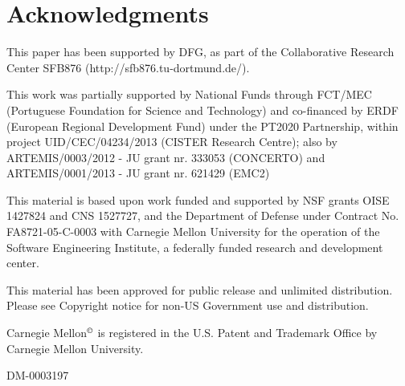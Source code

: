 \begingroup
\let\clearpage\relax
\let\cleardoublepage\relax
\let\cleardoublepage\relax



\vfill

\chapter*{Acknowledgments}

This paper has been supported by DFG, as part of the Collaborative
Research Center SFB876 (http://sfb876.tu-dortmund.de/).

This work was partially supported by National Funds through FCT/MEC (Portuguese Foundation for Science and Technology) and co-financed by ERDF (European Regional Development Fund) under the PT2020 Partnership, within project UID/CEC/04234/2013 (CISTER Research Centre); also by \\ARTEMIS/0003/2012 - JU grant nr. 333053 (CONCERTO) and \\ARTEMIS/0001/2013 - JU grant nr. 621429 (EMC2)

This material is based upon work funded and supported by NSF grants OISE 1427824 and CNS 1527727, and the Department of Defense under Contract No. FA8721-05-C-0003 with Carnegie Mellon University for the operation of the Software Engineering Institute, a federally funded research and development center.

 This material has been approved for public release and unlimited distribution. Please see Copyright notice for non-US Government use and distribution.

\noindent Carnegie Mellon$^\copyright$ is registered in the U.S. Patent and Trademark Office by Carnegie Mellon University.

\noindent DM-0003197

\endgroup			

\vfill
